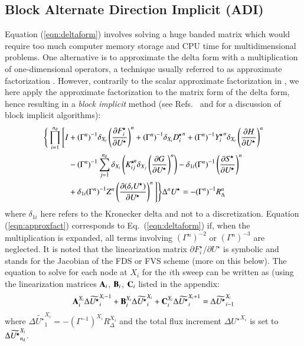 \documentclass{warpdoc}
\newcommand{\alb}{\vspace{0.2cm}\\} %
\newcommand{\nd}{{n_{\rm d}}}
\newcommand{\B}{{\bf B}}
\newcommand{\A}{{\bf A}}
\newcommand{\C}{{\bf C}}
\newcommand{\Dstar}{D^{\!\star}}
\newcommand{\Fstar}{F^{\!\star}}
\newcommand{\Ustar}{U^{\!\star}}
\newcommand{\Sstar}{S^{\!\star}}
\newcommand{\Kstar}{K^{\!\star}}
\newcommand{\Ystar}{Y^{\!\star}}
\begin{document}
\subsection{Block Alternate Direction Implicit (ADI)}

Equation (\ref{eqn:deltaform}) involves solving a huge banded matrix
which would require too much computer memory storage and CPU
time for multidimensional problems. One alternative is to approximate
the delta form with a multiplication of one-dimensional operators,
a technique usually referred to as approximate factorization \cite{misc:1955:peaceman,
misc:1955:douglas}. However, contrarily to the scalar approximate factorization in \cite{misc:1955:peaceman}, we here apply the approximate factorization to the matrix form of the delta form, hence resulting in a \emph{block implicit} method (see Refs.\ \cite{jcp:1980:briley} and \cite[pp.\ 318--319]{book:2001:oran} for a discussion of block implicit algorithms):
%
\begin{align}
\Bigg\{   \prod_{i=1}^{\nd}
  \Bigg[ I
        &+{(\Gamma^n)}^{-1} \delta_{X_i} \left(\frac{\partial \Fstar_i}{ \partial \Ustar}\right)^n
        +{(\Gamma^n)}^{-1} \delta_{X_i} {\Dstar_i}^n
        +{(\Gamma^n)}^{-1} {\Ystar_i}^n\delta_{X_i} \left(\frac{\partial H}{ \partial \Ustar}\right)^n
\nonumber\alb
&
        - {(\Gamma^n)}^{-1} \sum_{j=1}^{\nd} \delta_{X_i} \left( {\Kstar_{ij}}^{\!\! n}\delta_{X_j} \left(\frac{\partial G}{ \partial \Ustar}\right)^n \right) 
        -\delta_{1i} {(\Gamma^n)}^{-1} \left(\frac{\partial \Sstar}{ \partial \Ustar}\right)^n \nonumber\alb
&
        +\delta_{1i} {(\Gamma^n)}^{-1} Z^n \left(\frac{\partial (\delta_t \Ustar)}{  \partial \Ustar}\right)^n
\Bigg] \Bigg\} \Delta^n {\Ustar}
        = - {(\Gamma^n)}^{-1} R_{\Delta}^n
\label{eqn:approxfact}
\end{align}
%
where $\delta_{1i}$ here refers to the Kronecker delta and not to
a discretization. 
Equation (\ref{eqn:approxfact}) corresponds to Eq.~(\ref{eqn:deltaform})
if, when the multiplication is expanded, all terms involving ${(\Gamma^n)}^{-2}$
or ${(\Gamma^n)}^{-3}$ are neglected.
It is noted that the linearization matrix $\partial \Fstar_i / \partial \Ustar$ is symbolic
and stands for the Jacobian of the FDS or FVS scheme (more on this below).
The equation to solve for each node at $X_i$ for the $i$th sweep can be written as
(using the linearization matrices $\A_i$, $\B_i$, $\C_i$ listed in the appendix:
%
\begin{equation}
\begin{array}{r}
\A_i^{X_i} \Delta \widetilde{\Ustar}_i^{X_i-1} +
\B_i^{X_i} \Delta \widetilde{\Ustar}_i^{X_i} +
\C_i^{X_i} \Delta \widetilde{\Ustar}_i^{X_i+1} =
{\Delta \widetilde{\Ustar}^{X_i}_{i-1}}
\end{array}
\end{equation}
%
where ${\Delta \widetilde{\Ustar}^{X_i}_1}=- (\Gamma^{-1})^{X_i} R_{\Delta}^{X_i}$
and the total flux increment $\Delta {\Ustar}^{X_i}$ is set to ${\Delta \widetilde{\Ustar}^{X_i}_{\nd}}$.
\end{document}
